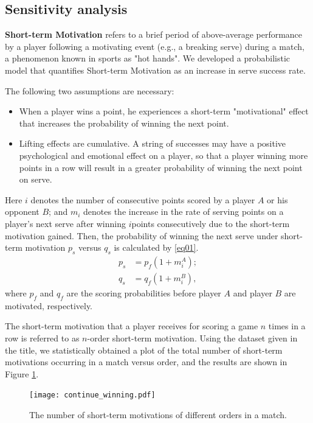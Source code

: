 \documentclass{mcmthesis}
\begin{document}
\subsection{Sensitivity analysis}
\textbf{Short-term Motivation} refers to a brief period of above-average performance by a player
following a motivating event (e.g., a breaking serve) during a match, a phenomenon known
in sports as "hot hands". We developed a probabilistic model that quantifies Short-term
Motivation as an increase in serve success rate.\par
The following two assumptions are necessary:
\begin{itemize}
  \item When a player wins a point, he experiences a short-term "motivational" effect that increases
  the probability of winning the next point.
  \item Lifting effects are cumulative. A string of successes may have a positive psychological
  and emotional effect on a player, so that a player winning more points in a row will result
  in a greater probability of winning the next point on serve.
\end{itemize}
Here $i$ denotes the number of consecutive points scored by a player $A$ or his opponent $B$;
and $m_i$ denotes the increase in the rate of serving points on a player’s next serve after winning
$i$points consecutively due to the short-term motivation gained. Then, the probability of winning
the next serve under short-term motivation $p_s$ versus $q_s$ is calculated by \eqref{eq01}.
\begin{equation}
  \begin{split}
    p_s &= p_f(1+m_i^A);\\
    q_s &= q_f(1+m_i^B),
  \end{split}
  \label{eq01}
\end{equation}
where $p_f$ and $q_f$ are the scoring probabilities before player $A$ and player $B$ are motivated,
respectively.\par
The short-term motivation that a player receives for scoring a game $n$ times in a row is
referred to as $n$-order short-term motivation. Using the dataset given in the title, we statistically
obtained a plot of the total number of short-term motivations occurring in a match versus order,
and the results are shown in Figure \ref{fig3}. \par
\begin{figure}[h]
  \centering
  \texttt{[image: continue\_winning.pdf]}
  \caption{The number of short-term motivations of different orders in a match.} \label{fig4}
  \label{fig3}
\end{figure}
\end{document}
